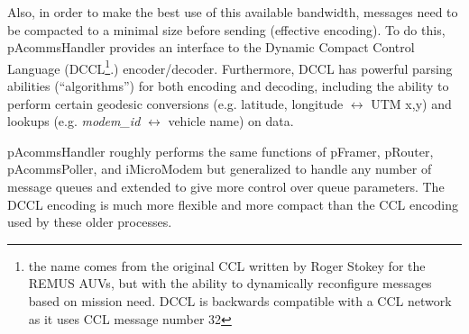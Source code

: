 \documentclass[11pt, letterpaper, oneside]{memoir}
\begin{document}
Also, in order to make the best use of this available bandwidth, messages need to be compacted to a minimal size before sending (effective encoding). To do this, pAcommsHandler provides an interface to the Dynamic Compact Control Language (DCCL\footnote{the name comes from the original CCL written by Roger Stokey for the REMUS AUVs, but with the ability to dynamically reconfigure messages based on mission need. DCCL is backwards compatible with a CCL network as it uses CCL message number 32}.) encoder/decoder. Furthermore, DCCL has powerful parsing abilities (``algorithms'') for both encoding and decoding, including the ability to perform certain geodesic conversions (e.g. latitude, longitude $\leftrightarrow$ UTM x,y) and lookups (e.g. \textit{modem\_id} $\leftrightarrow$ vehicle name) on data.

pAcommsHandler roughly performs the same functions of pFramer, pRouter, pAcommsPoller, and iMicroModem but
generalized to handle any number of message queues and extended to give more control over queue parameters. The DCCL encoding is much more flexible and more compact than the CCL encoding used by these older processes.
\end{document}
